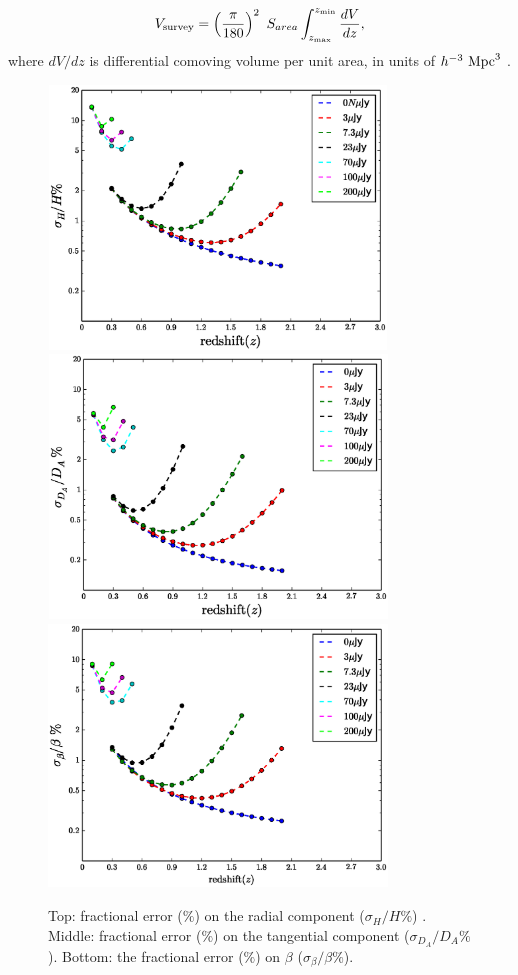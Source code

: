 \documentclass[useAMS,usenatbib]{mn2e}
\begin{document}
\begin{equation}\label{Vsurvey}
V_{\rm survey} = \left(\frac{\pi}{180}\right)^2 \ S_{area}\int^{z_{\rm min}}_{z_{\rm max}} \frac{dV}{dz}, 
\end{equation}
where $dV/dz$  is differential comoving volume per unit area, in units of $h^{-3} \ {\rm Mpc}^3$ \citep{Hogg:1999ad}.
\begin{center}
\begin{figure}
\includegraphics[height=7cm,width=9cm]{plots/output_lnH_mario_bias.eps}
\includegraphics[height=7cm,width=9cm]{plots/output_lnda_mario_bias.eps}
\includegraphics[height=7cm,width=9cm]{plots/output_beta_mario_bias.eps}
\caption{Top: fractional error ($\%$)  on  the radial component ($\sigma_H/H \%$) . Middle:  fractional error ($\%$) on the tangential component  ($\sigma_{D_A}/D_A  \%$). Bottom: the fractional error ($\%$) on $\beta$ ($\sigma_\beta/\beta \%$).}
\label{fig:fraction}
\end{figure}
\end{center}
\end{document}
